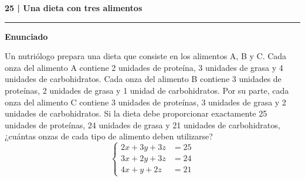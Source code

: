 \documentclass[11pt,a4paper,landscape]{article}
\newcommand{\titulo}[1]{{\LARGE\bfseries #1}\par\smallskip\hrule\medskip}
\begin{document}
\titulo{25 | Una dieta con tres alimentos}
\textbf{Enunciado}\par Un nutriólogo prepara una dieta que consiste en los alimentos A, B y C. Cada onza del alimento A contiene 2 unidades de proteína, 3 unidades de grasa y 4 unidades de carbohidratos. Cada onza del alimento B contiene 3 unidades de proteínas, 2 unidades de grasa y 1 unidad de carbohidratos. Por su parte, cada onza del alimento C contiene 3 unidades de proteínas, 3 unidades de grasa y 2 unidades de carbohidratos. Si la dieta debe proporcionar exactamente 25 unidades de proteínas, 24 unidades de grasa y 21 unidades de carbohidratos, ¿cuántas onzas de cada tipo de alimento deben utilizarse?
\[\left\{\begin{aligned}2x + 3y + 3z &= 25\\3x + 2y + 3z &= 24\\4x + y + 2z &= 21\end{aligned}\right.\]
\end{document}

